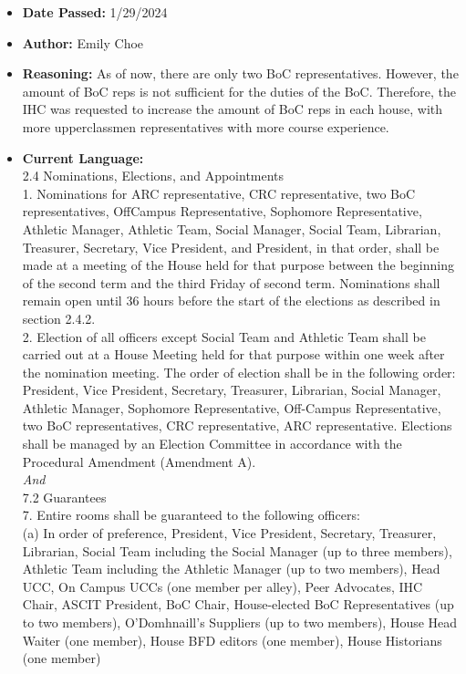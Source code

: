 \documentclass[10pt]{article} %
\begin{document}
\begin{itemize}
	\item \textbf{Date Passed:} 1/29/2024
	\item \textbf{Author:} Emily Choe
	\item \textbf{Reasoning:} As of now, there are only two BoC representatives. However, the amount of BoC reps is not sufficient for the duties of the BoC. Therefore, the IHC was requested to increase the amount of BoC reps in each house, with more upperclassmen representatives with more course experience.
	\item \textbf{Current Language:} \\
	2.4 Nominations, Elections, and Appointments \\
	1. Nominations for ARC representative, CRC representative, two BoC representatives, OffCampus Representative, Sophomore Representative, Athletic Manager, Athletic Team, Social Manager, Social Team, Librarian, Treasurer, Secretary, Vice President, and President, in that order, shall be made at a meeting of the House held for that purpose between the beginning of the second term and the third Friday of second term. Nominations shall remain open until 36 hours before the start of the elections as described in section 2.4.2. \\
	2. Election of all officers except Social Team and Athletic Team shall be carried out at a House Meeting held for that purpose within one week after the nomination meeting. The order of election shall be in the following order: President, Vice President, Secretary, Treasurer, Librarian, Social Manager, Athletic Manager, Sophomore Representative, Off-Campus Representative, two BoC representatives, CRC representative, ARC representative. Elections shall be managed by an Election Committee in accordance with the Procedural Amendment (Amendment A). \\
	\textit{And} \\
	7.2 Guarantees \\
	7. Entire rooms shall be guaranteed to the following officers: \\
	(a) In order of preference, President, Vice President, Secretary, Treasurer, Librarian, Social Team including the Social Manager (up to three members), Athletic Team including the Athletic Manager (up to two members), Head UCC, On Campus UCCs (one member per alley), Peer Advocates, IHC Chair, ASCIT President, BoC Chair, House-elected BoC Representatives (up to two members), O’Domhnaill’s Suppliers (up to two members), House Head Waiter (one member), House BFD editors (one member), House Historians (one member) \\

\end{itemize}
\end{document}
